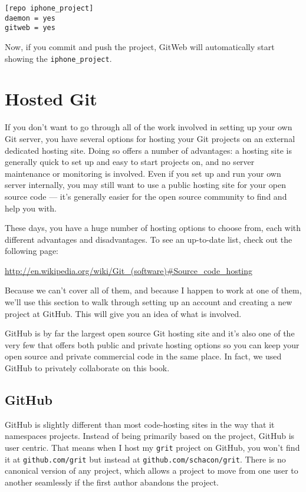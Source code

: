 \documentclass[a4paper]{book}
\begin{document}
\begin{shaded}\begin{verbatim}
[repo iphone_project]
daemon = yes
gitweb = yes
\end{verbatim}\end{shaded}

Now, if you commit and push the project, GitWeb will automatically start showing the \texttt{iphone\_project}.

\section{Hosted Git}

If you don't want to go through all of the work involved in setting up your own Git server, you have several options for hosting your Git projects on an external dedicated hosting site. Doing so offers a number of advantages: a hosting site is generally quick to set up and easy to start projects on, and no server maintenance or monitoring is involved. Even if you set up and run your own server internally, you may still want to use a public hosting site for your open source code --- it's generally easier for the open source community to find and help you with.

These days, you have a huge number of hosting options to choose from, each with different advantages and disadvantages. To see an up-to-date list, check out the following page:

\url{http://en.wikipedia.org/wiki/Git_(software)\#Source_code_hosting}

Because we can't cover all of them, and because I happen to work at one of them, we'll use this section to walk through setting up an account and creating a new project at GitHub. This will give you an idea of what is involved.

GitHub is by far the largest open source Git hosting site and it's also one of the very few that offers both public and private hosting options so you can keep your open source and private commercial code in the same place. In fact, we used GitHub to privately collaborate on this book.

\subsection{GitHub}

GitHub is slightly different than most code-hosting sites in the way that it namespaces projects. Instead of being primarily based on the project, GitHub is user centric. That means when I host my \texttt{grit} project on GitHub, you won't find it at \texttt{github.com/grit} but instead at \texttt{github.com/schacon/grit}. There is no canonical version of any project, which allows a project to move from one user to another seamlessly if the first author abandons the project.
\end{document}

